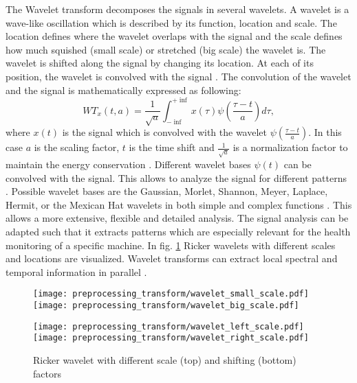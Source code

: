 The Wavelet transform decomposes the signals in several wavelets. A wavelet is a wave-like oscillation which is described by its function, location and scale. The location defines where the wavelet overlaps with the signal and the scale defines how much squished (small scale) or stretched (big scale) the wavelet is. The wavelet is shifted along the signal by changing its location. At each of its position, the wavelet is convolved with the signal \cite{Shawhin2020}. The convolution of the wavelet and the signal is mathematically expressed as following:
\begin{equation}
    WT_{x}(t,a) = \frac{1}{\sqrt{a}} \int_{- \inf}^{+ \inf} x(\tau) \psi(\frac{\tau -t}{a}) d \tau,
\end{equation}
 where $x(t)$ is the signal which is convolved with the wavelet $\psi(\frac{\tau -t}{a})$. In this case $a$ is the scaling factor, $t$ is the time shift and $\frac{1}{\sqrt{a}}$ is a normalization factor to maintain the energy conservation \cite{FENG2013}. Different wavelet bases $\psi(t)$ can be convolved with the signal. This allows to analyze the signal for different patterns \cite{Shawhin2020}. Possible wavelet bases are the Gaussian, Morlet, Shannon, Meyer, Laplace, Hermit, or the Mexican Hat wavelets in both simple and complex functions \cite{Verstraete2017}. This allows a more extensive, flexible and detailed analysis. The signal analysis can be adapted such that it extracts patterns which are especially relevant for the health monitoring of a specific machine. In fig. \ref{fig:ricker_wavelet} Ricker wavelets with different scales and locations are visualized. Wavelet transforms can extract local spectral and temporal information in parallel \cite{Shawhin2020}.


\begin{figure}[H]
  \centering
  \texttt{[image: preprocessing\_transform/wavelet\_small\_scale.pdf]}
  \hspace{.1cm}
  \texttt{[image: preprocessing\_transform/wavelet\_big\_scale.pdf]}
  
  \vspace{.1cm}
  
  \texttt{[image: preprocessing\_transform/wavelet\_left\_scale.pdf]}
  \hspace{.1cm}
  \texttt{[image: preprocessing\_transform/wavelet\_right\_scale.pdf]}

  \caption{Ricker wavelet with different scale (top) and shifting (bottom) factors}
  \label{fig:ricker_wavelet}
\end{figure}


